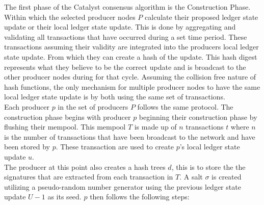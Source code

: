 The first phase of the Catalyst consensus algorithm is the Construction Phase. Within which the selected producer nodes  $P$ calculate their proposed ledger state update or their local ledger state update. This is done by aggregating and validating all transactions that have occurred during a set time period. These transactions assuming their validity are integrated into the producers local ledger state update. From which they can create a hash of the update. This hash digest represents what they believe to be the correct update and is broadcast to the other producer nodes during for that cycle. Assuming the collision free nature of hash functions, the only mechanism for multiple producer nodes to have the same local ledger state update is by both using the same set of transactions. \\

Each producer $p$ in the set of producers $P$ follows the same protocol. The construction phase begins with producer $p$ beginning their construction phase by flushing their mempool. This mempool $T$ is made up of $n$ transactions $t$  where $n$ is the number of transactions that have been broadcast to the network and have been stored by $p$. These transaction are used to create $p$'s local ledger state update $u$. \\

The producer at this point also creates a hash trees $d$, this is to store the the signatures that are extracted from each transaction in $T$. A salt $\sigma$ is created utilizing a pseudo-random number generator using the previous ledger state update $U-1$ as its seed. $p$ then follows the following steps:

